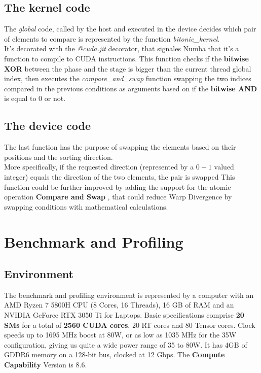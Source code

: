 \documentclass[a4paper, 12pt, oneside]{article}
\begin{document}
\subsection{The kernel code}
The \textit{global} code, called by the host and executed in the device decides which pair of elements to compare is represented by the function \textit{bitonic\_kernel}.\\
It's decorated with the \textit{@cuda.jit} decorator, that signales Numba that it's a function to compile to CUDA instructions.
This function checks if the \textbf{bitwise XOR} between the phase and the stage is bigger than the current thread global index, then executes the \textit{compare\_and\_swap} function swapping the two indices compared in the previous conditions as arguments based on if the \textbf{bitwise AND} is equal to 0 or not.

\subsection{The device code}
The last function has the purpose of swapping the elements based on their positions and the sorting direction.\\
More specifically, if the requested direction (represented by a $0-1$ valued integer) equals the direction of the two elements, the pair is swapped
This function could be further improved by adding the support for the atomic operation \textbf{Compare and Swap} \cite{cas}, that could reduce Warp Divergence by swapping conditions with mathematical calculations.

\section{Benchmark and Profiling}

\subsection{Environment}
The benchmark and profiling environment is represented by a computer with an AMD Ryzen 7 5800H CPU (8 Cores, 16 Threads), 16 GB of RAM and an NVIDIA GeForce RTX 3050 Ti for Laptops.
Basic specifications comprise \textbf{20 SMs} for a total of \textbf{2560 CUDA cores}, 20 RT cores and 80 Tensor cores. Clock speeds up to 1695 MHz boost at 80W, or as low as 1035 MHz for the 35W configuration, giving us quite a wide power range of 35 to 80W.
It has 4GB of GDDR6 memory on a 128-bit bus, clocked at 12 Gbps.
The \textbf{Compute Capability} Version is 8.6.
\end{document}
